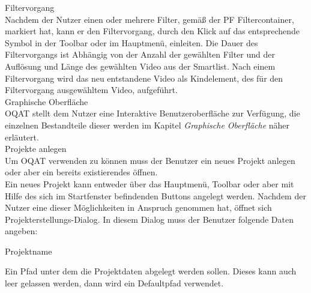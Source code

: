  Filtervorgang\\
Nachdem der Nutzer einen oder mehrere Filter, gemäß der PF Filtercontainer, markiert hat, kann er
den Filtervorgang, durch den Klick auf das entsprechende Symbol in der Toolbar oder im Hauptmenü,
einleiten. Die Dauer des Filtervorgangs ist Abhängig von der Anzahl der gewählten Filter und der Auflösung
und Länge des gewählten Video aus der Smartlist. Nach einem Filtervorgang wird das neu entstandene Video
als Kindelement, des für den Filtervorgang ausgewähltem Video, aufgeführt.\\
 Graphische Oberfläche \\
\gls{OQAT} stellt dem Nutzer eine Interaktive Benutzeroberfläche zur Verfügung, die
einzelnen Bestandteile dieser werden im Kapitel \emph{Graphische Oberfläche} näher erläutert.\\
 Projekte anlegen \\
Um \gls{OQAT} verwenden zu können muss der Benutzer ein neues Projekt anlegen oder aber
ein bereits existierendes öffnen. \\
Ein neues Projekt kann entweder über das Hauptmenü, Toolbar oder aber mit Hilfe des sich
im Startfenster befindenden Buttons angelegt werden. Nachdem der Nutzer eine dieser Möglichkeiten
in Anspruch genommen hat, öffnet sich Projekterstellungs-Dialog. In diesem Dialog
muss der Benutzer folgende Daten angeben:
\begin{compactitem}
\item Projektname
\item Ein Pfad unter dem die Projektdaten abgelegt werden sollen. Dieses kann auch leer gelassen werden, 
dann wird ein Defaultpfad verwendet.
\end{compactitem}

